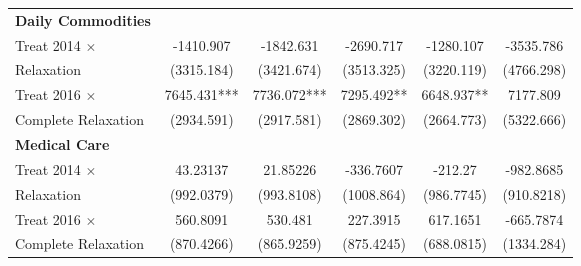 \documentclass[12pt]{extarticle}
\begin{document}
\begin{table}
\begin{threeparttable}
\begin{tabular}{l*{5}{c}}
\textbf{Daily Commodities} \\
Treat 2014 $\times$ &   -1410.907   &   -1842.631   &   -2690.717   &   -1280.107   &   -3535.786   \\
\quad 2014 Relaxation     &  (3315.184)   &  (3421.674)   &  (3513.325)   &  (3220.119)   &  (4766.298)   \\
Treat 2016 $\times$ &    7645.431***&    7736.072***&    7295.492** &    6648.937** &    7177.809   \\
\quad Complete Relaxation &  (2934.591)   &  (2917.581)   &  (2869.302)   &  (2664.773)   &  (5322.666)   \\

\textbf{Medical Care} \\
Treat 2014 $\times$ &    43.23137   &    21.85226   &   -336.7607   &     -212.27   &   -982.8685   \\
\quad 2014 Relaxation     &  (992.0379)   &  (993.8108)   &  (1008.864)   &  (986.7745)   &  (910.8218)   \\
Treat 2016 $\times$ &    560.8091   &     530.481   &    227.3915   &    617.1651   &   -665.7874   \\
\quad Complete Relaxation &  (870.4266)   &  (865.9259)   &  (875.4245)   &  (688.0815)   &  (1334.284)   \\


\end{tabular}
\end{threeparttable}
\end{table}
\end{document}
